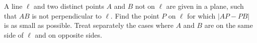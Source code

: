 A line $\ell$ and two distinct points $A$ and $B$ not on $\ell$ are given in a plane, such that $AB$ is not perpendicular to $\ell$. Find the point $P$ on $\ell$ for which $|AP-PB|$ is as small as possible. Treat separately the cases where $A$ and $B$ are on the same side of $\ell$ and on opposite sides.

